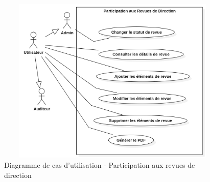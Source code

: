 \begin{figure}[H]
    \centering
    \includegraphics[width=12cm,height=8cm]{images/participationrevueuc.png}
    \caption{Diagramme de cas d'utilisation - Participation aux revues de direction}
\end{figure}

